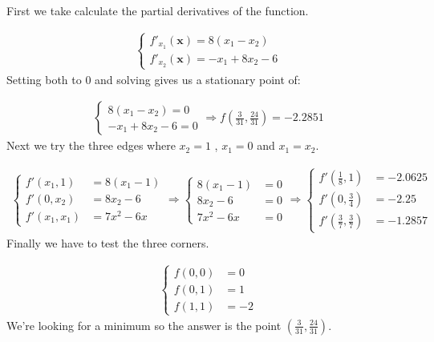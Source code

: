 \documentclass{article}
\begin{document}
\subsubsection{}

First we take calculate the partial derivatives of the function.

\begin{align*}
  \begin{cases}
    f'_{x_1}(\mathbf{x}) = 8 (x_1 - x_2) \\
    f'_{x_2}(\mathbf{x}) = - x_1 + 8 x_2 - 6
  \end{cases}
\end{align*}
Setting both to $0$ and solving gives us a stationary point of:

\begin{align*}
  \begin{cases}
    8 (x_1 - x_2)     = 0 \\
    - x_1 + 8 x_2 - 6 = 0
  \end{cases}
  \Rightarrow f\left(\frac{3}{31}, \frac{24}{31} \right) = -2.2851
\end{align*}
Next we try the three edges where $x_2 = 1$ , $ x_1 = 0$ and $ x_1 = x_2$.

\begin{align*}
  \begin{cases}
    f'(x_1, 1)   &= 8 (x_1 - 1) \\
    f'(0, x_2)   &= 8 x_2 - 6 \\
    f'(x_1, x_1) &= 7 x^2 - 6x
  \end{cases}
  \Rightarrow
  \begin{cases}
    8 (x_1 - 1) &= 0 \\
    8 x_2 - 6   &= 0 \\
    7 x^2 - 6x  &= 0
  \end{cases}
  \Rightarrow
  \begin{cases}
    f'\left(\frac{1}{8}, 1 \right)           &= -2.0625 \\
    f'\left(0, \frac{3}{4} \right)           &= -2.25   \\
    f'\left(\frac{3}{7}, \frac{3}{7} \right) &= -1.2857
  \end{cases}
\end{align*}
Finally we have to test the three corners.

\begin{align*}
  \begin{cases}
    f(0,0) &= 0 \\
    f(0,1) &= 1 \\
    f(1,1) &= -2
  \end{cases}
\end{align*}
We're looking for a minimum so the answer is the point $\left(\frac{3}{31}, \frac{24}{31} \right)$.
\end{document}
